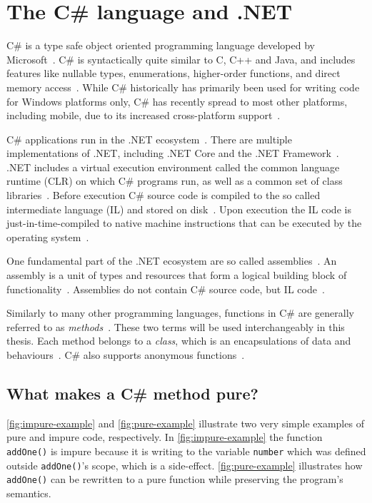 \documentclass[a4paper,12pt]{article}
\begin{document}
\section{The C\# language and .NET} \label{sub:the-csharp-language}

C\# is a type safe object oriented programming language developed by Microsoft~\cite{albahari2003nutshell}. C\# is syntactically quite similar to C, C++ and Java, and includes features like nullable types, enumerations, higher-order functions, and direct memory access~\cite{intro-to-Csharp}. While C\# historically has primarily been used for writing code for Windows platforms only, C\# has recently spread to most other platforms, including mobile, due to its increased cross-platform support~\cite{albahari2003nutshell}.

C\# applications run in the .NET ecosystem~\cite{intro-to-Csharp}. There are multiple implementations of .NET, including .NET Core and the .NET Framework~\cite{intro-to-Csharp}. .NET includes a virtual execution environment called the common language runtime (CLR) on which C\# programs run, as well as a common set of class libraries~\cite{albahari2003nutshell}. Before execution C\# source code is compiled to the so called intermediate language (IL) and stored on disk~\cite{intro-to-Csharp}. Upon execution the IL code is just-in-time-compiled to native machine instructions that can be executed by the operating system~\cite{intro-to-Csharp}.

One fundamental part of the .NET ecosystem are so called assemblies~\cite{assemblies}. An assembly is a unit of types and resources that form a logical building block of functionality~\cite{assemblies}. Assemblies do not contain C\# source code, but IL code~\cite{assemblies-overview}.

Similarly to many other programming languages, functions in C\# are generally referred to as \textit{methods}~\cite{albahari2003nutshell}. These two terms will be used interchangeably in this thesis. Each method belongs to a \textit{class}, which is an encapsulations of data and behaviours~\cite{albahari2003nutshell}. C\# also supports anonymous functions~\cite{albahari2003nutshell}.

\subsection{What makes a C\# method pure?} \label{sub:What makes a Cs program functional?}
\autoref{fig:impure-example} and \autoref{fig:pure-example} illustrate two very simple examples of pure and impure code, respectively. In \autoref{fig:impure-example} the function \texttt{addOne()} is impure because it is writing to the variable \texttt{number} which was defined outside \texttt{addOne()}'s scope, which is a side-effect. \autoref{fig:pure-example} illustrates how \texttt{addOne()} can be rewritten to a pure function while preserving the program's semantics.
\end{document}
